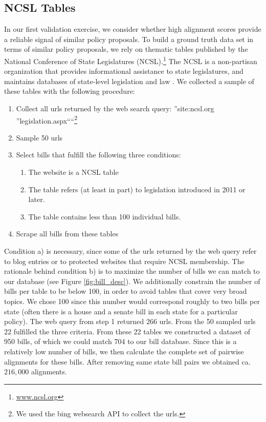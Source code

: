 \documentclass[12pt]{article} %
\begin{document}
\subsection{NCSL Tables}

In our first validation exercise, we consider whether high alignment scores provide a reliable signal of similar policy proposals. To build a ground truth data set in terms of similar policy proposals, we rely on thematic tables published by the National Conference of State Legislatures (NCSL).\footnote{\url{www.ncsl.org}} The NCSL is a non-partisan organization that provides informational assistance to state legislatures, and maintains databases of state-level legislation and law \citep{rivera2014immigration}.  We collected a sample of these tables with the following procedure:

\begin{singlespacing}

\begin{enumerate}
    \item Collect all urls returned by the web search query: ''site:ncsl.org ''legislation.aspx````\footnote{We used the bing websearch API to collect the urls.}
    \item Sample 50 urls
    \item Select bills that fulfill the following three conditions:
        \begin{enumerate}
            \item The website is a NCSL table
            \item The table refers (at least in part) to legislation introduced in 2011 or later.          
             \item The table contains less than 100 individual bills. 
        \end{enumerate}
    \item Scrape all bills from these tables
\end{enumerate}

\end{singlespacing}

Condition a) is necessary, since some of the urls returned by the web query refer to blog entries or to protected websites that require NCSL membership. The rationale behind condition b) is to maximize the number of bills we can match to our database (see Figure \ref{fig:bill_desc}). We additionally constrain the number of bills per table to be below 100, in order to avoid tables that cover very broad topics. We chose 100 since this number would correspond roughly to two bills per state (often there is a house and a senate bill in each state for a particular policy).
The web query from step 1 returned 266 urls. From the 50 sampled urls 22
fulfilled the three criteria. From these 22 tables we constructed a dataset of
950 bills, of which we could match 704 to our bill database. Since this is a
relatively low number of bills, we then calculate the complete set of pairwise
alignments for these bills. After removing same state bill pairs we obtained ca. $216,000$ alignments.
\end{document}
